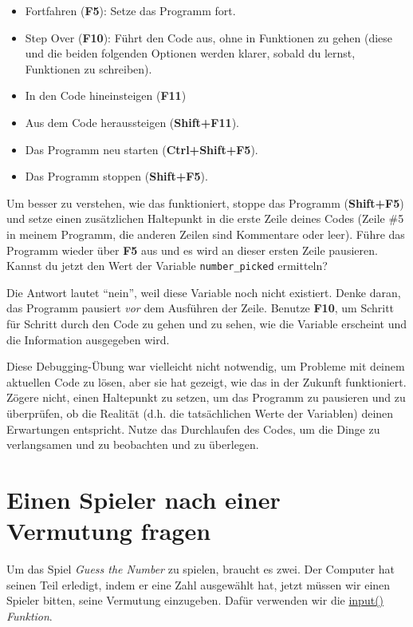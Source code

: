 \documentclass[
]{book}
\providecommand{\tightlist}{%
  \setlength{\itemsep}{0pt}\setlength{\parskip}{0pt}}
\begin{document}
\begin{itemize}
\tightlist
\item
  Fortfahren (\textbf{F5}): Setze das Programm fort.
\item
  Step Over (\textbf{F10}): Führt den Code aus, ohne in Funktionen zu gehen (diese und die beiden folgenden Optionen werden klarer, sobald du lernst, Funktionen zu schreiben).
\item
  In den Code hineinsteigen (\textbf{F11})
\item
  Aus dem Code heraussteigen (\textbf{Shift+F11}).
\item
  Das Programm neu starten (\textbf{Ctrl+Shift+F5}).
\item
  Das Programm stoppen (\textbf{Shift+F5}).
\end{itemize}

Um besser zu verstehen, wie das funktioniert, stoppe das Programm (\textbf{Shift+F5}) und setze einen zusätzlichen Haltepunkt in die erste Zeile deines Codes (Zeile \#5 in meinem Programm, die anderen Zeilen sind Kommentare oder leer). Führe das Programm wieder über \textbf{F5} aus und es wird an dieser ersten Zeile pausieren. Kannst du jetzt den Wert der Variable \texttt{number\_picked} ermitteln?

Die Antwort lautet ``nein'', weil diese Variable noch nicht existiert. Denke daran, das Programm pausiert \emph{vor} dem Ausführen der Zeile. Benutze \textbf{F10}, um Schritt für Schritt durch den Code zu gehen und zu sehen, wie die Variable erscheint und die Information ausgegeben wird.

Diese Debugging-Übung war vielleicht nicht notwendig, um Probleme mit deinem aktuellen Code zu lösen, aber sie hat gezeigt, wie das in der Zukunft funktioniert. Zögere nicht, einen Haltepunkt zu setzen, um das Programm zu pausieren und zu überprüfen, ob die Realität (d.h. die tatsächlichen Werte der Variablen) deinen Erwartungen entspricht. Nutze das Durchlaufen des Codes, um die Dinge zu verlangsamen und zu beobachten und zu überlegen.

\hypertarget{input-function}{%
\section{Einen Spieler nach einer Vermutung fragen}\label{input-function}}

Um das Spiel \emph{Guess the Number} zu spielen, braucht es zwei. Der Computer hat seinen Teil erledigt, indem er eine Zahl ausgewählt hat, jetzt müssen wir einen Spieler bitten, seine Vermutung einzugeben. Dafür verwenden wir die \href{https://docs.python.org/3/library/functions.html\#input}{input()} \emph{Funktion}.
\end{document}
